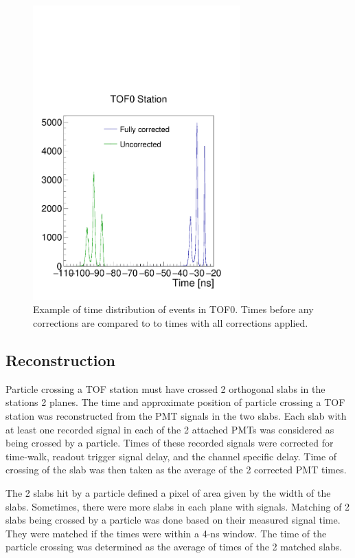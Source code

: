 \begin{figure}[!ht]
  \centering
  \includegraphics[width=8cm]{04_tof0_corrected_vs_uncorrected}
  \caption{Example of time distribution of events in TOF0. Times
    before any corrections are compared to to times with all
    corrections applied.}
  \label{fig:tof0times}
\end{figure}

\subsection{Reconstruction}

Particle crossing a TOF station must have crossed 2 orthogonal slabs
in the stations 2 planes.  The time and approximate position of
particle crossing a TOF station was reconstructed from the PMT signals
in the two slabs. Each slab with at least one recorded signal in each
of the 2 attached PMTs was considered as being crossed by a
particle. Times of these recorded signals were corrected for
time-walk, readout trigger signal delay, and the channel specific
delay. Time of crossing of the slab was then taken as the average of
the 2 corrected PMT times.

The 2 slabs hit by a particle defined a pixel of area given by the
width of the slabs. Sometimes, there were more slabs in each plane
with signals. Matching of 2 slabs being crossed by a particle was done
based on their measured signal time. They were matched if the times
were within a 4-ns window. The time of the particle crossing was
determined as the average of times of the 2 matched slabs.


